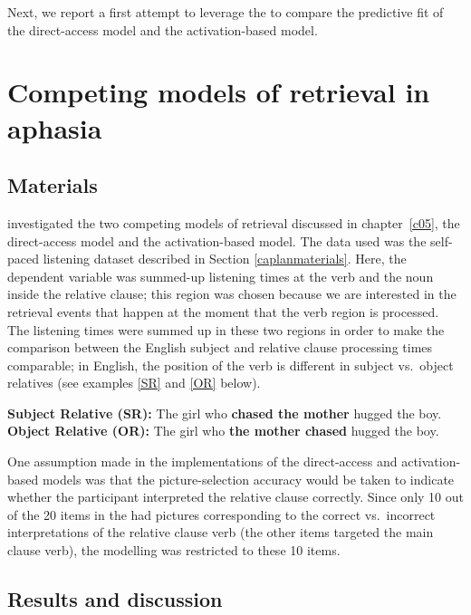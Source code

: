 \documentclass{cambridge7A}\usepackage[]{graphicx}\usepackage[]{color}
\begin{document}
Next, we report a first attempt to leverage the \cite{CaplanEtAl2015} to compare the predictive fit of the direct-access model and the activation-based model.

\section{Competing models of retrieval in aphasia} \label{c06:competing}

\subsection{Materials}

\cite{LissonEtAl2020} investigated the two competing models of retrieval discussed in chapter~\ref{c05}, the direct-access model and the activation-based model. The data used was the self-paced listening dataset  \cite{CaplanEtAl2015} described in Section \ref{caplanmaterials}. Here, the dependent variable was summed-up listening times at the verb and the noun inside the relative clause; this region was chosen because we are interested in the retrieval events that happen at the moment that the verb region is processed. The listening times were summed up in these two regions in order to make the comparison between the English subject and relative clause processing times comparable; in English, the position of the verb is different in subject vs.\ object relatives (see examples \ref{SR} and \ref{OR} below). 

\begin{exe}
\label{ex-caplan}
\ex \begin{xlist}
  \ex\label{SR}{\textbf{Subject Relative (SR):} The girl who \textbf{chased the mother} hugged the boy.}
  \ex\label{OR}{\textbf{Object Relative (OR):} The girl who \textbf{the mother chased} hugged the boy.}
  \end{xlist}
\end{exe}

One assumption made in the implementations of the direct-access and activation-based models was that the picture-selection accuracy would be taken to indicate whether the participant interpreted the relative clause correctly. Since  only 10 out of the 20 items in the \cite{CaplanEtAl2015} had pictures corresponding to the correct vs.\ incorrect interpretations of the relative clause verb (the other items targeted the main clause verb), the modelling was restricted to these 10 items.

\subsection{Results and discussion}
\end{document}
